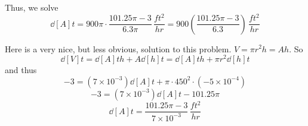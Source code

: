 \documentclass[nooutcomes]{ximera}
\begin{document}
\begin{problem}
\begin{freeResponse}
		Thus, we solve
		$$ \dd[A]{t} = 900 \pi \cdot \frac{101.25 \pi - 3}{6.3 \pi} \, \frac{ft^2}{hr} = 900 \left( \frac{101.25 \pi - 3}{6.3} \right) \, \frac{ft^2}{hr} $$
		
		
		Here is a very nice, but less obvious, solution to this problem.
		$V = \pi r^2 h = Ah$.  So 
		$$ \dd[V]{t} = \dd[A]{t} h + A \dd[h]{t} = \dd[A]{t} h + \pi r^2 \dd[h]{t}$$
		and thus
		$$ -3 = (7 \times 10^{-3}) \dd[A]{t} + \pi \cdot 450^2 \cdot (-5 \times 10^{-4}) $$
		$$ -3 = (7 \times 10^{-3}) \dd[A]{t} - 101.25 \pi  $$
		$$ \dd[A]{t} = \frac{101.25 \pi - 3}{7 \times 10^{-3}} \, \frac{ft^2}{hr} $$
		
		\end{freeResponse}
		
		
\end{problem}
\end{document}
